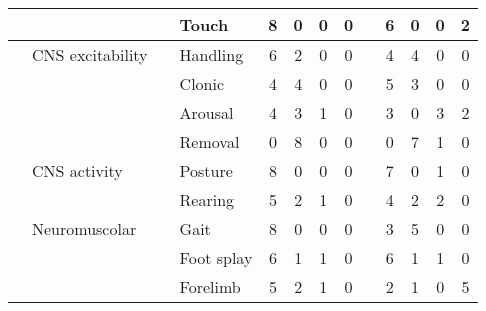 \begin{frame}
\begin{table}[h!]
\begin{tabular}{lll l cccc c cccc}
&&& \textcolor{cambridgedarkorange}{Touch}  &       8   &   0   &   0   &  0  &&
                  6   &   0   &   0   &  2\\

                  \midrule

&\textcolor{cambridgedarkblue}{CNS excitability}


&& \textcolor{cambridgedarkorange}{Handling}  &       6   &   2   &   0   &  0  &&
                     4   &   4   &   0   &  0\\

&&& \textcolor{cambridgedarkorange}{Clonic} &       4   &   4   &   0   &  0  &&
                  5   &   3   &   0   &  0\\

&&& \textcolor{cambridgedarkorange}{Arousal}  &     4   &   3   &   1   &  0  &&
                  3   &   0   &   3   &  2\\

&&& \textcolor{cambridgedarkorange}{Removal}  &       0   &   8   &   0   &  0  &&
                     0   &   7   &   1   &  0\\
                     
                                       \midrule
                     
&\textcolor{cambridgedarkblue}{CNS activity}

&& \textcolor{cambridgedarkorange}{Posture}  &       8   &   0   &   0   &  0  &&
                  7   &   0   &   1   &  0\\

&&& \textcolor{cambridgedarkorange}{Rearing} &      5   &   2   &   1   &  0  &&
                  4   &   2   &   2   &  0\\

                  \midrule

&\textcolor{cambridgedarkblue}{Neuromuscolar}

&& \textcolor{cambridgedarkorange}{Gait}&      8   &   0   &   0   &  0  &&
              3   &   5   &   0   &  0\\

&&& \textcolor{cambridgedarkorange}{Foot splay} &      6   &   1   &   1   &  0  &&
              6   &   1   &   1   &  0\\

&&& \textcolor{cambridgedarkorange}{Forelimb}  &      5   &   2   &   1   &  0  &&
              2   &   1   &   0   &  5\\


\end{tabular}
\end{table}
\end{frame}
